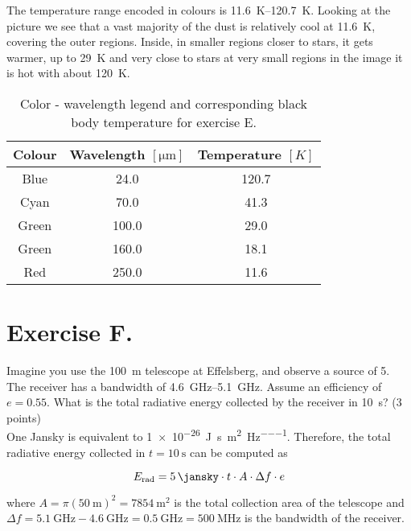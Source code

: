 \documentclass[11pt,a4paper,twoside]{article}
\begin{document}
The temperature range encoded in colours is \SIrange{11.6}{120.7}{\kelvin}.
Looking at the picture we see that a vast majority of the dust is relatively 
cool at \SI{11.6}{\kelvin}, covering the outer regions. Inside, in smaller
regions closer to stars, it gets warmer, up to \SI{29}{\kelvin} and very close
to stars at very small regions in the image it is hot with about
\SI{120}{\kelvin}.

\begin{table}[h!]
\centering
\begin{tabular}{ccc}\toprule
Colour  & Wavelength $[\si{\micro\meter}]$  & Temperature $[K]$  \\ \midrule
Blue    & 24.0  & 120.7                \\
Cyan    & 70.0  & 41.3                \\
Green   & 100.0 & 29.0                \\
Green   & 160.0 & 18.1                \\
Red     & 250.0 & 11.6               \\
\bottomrule
\end{tabular}
\caption{Color - wavelength legend and corresponding black body temperature for
         exercise E.}
\label{tab:col}
\end{table}


\section*{Exercise F.} 

Imagine you use the \SI{100}{\metre} telescope at Effelsberg, and observe a
source of \SI{5}{\jansky}. The receiver has a bandwidth of
\SIrange{4.6}{5.1}{\GHz}. Assume an efficiency of $e=\num{0.55}$. What is the total
radiative energy collected by the receiver in \SI{10}{\second}? (3 points) \\


One Jansky is equivalent to \SI{1e-26}{\joule\per\second\per\meter\squared\per\hertz}.
Therefore, the total radiative energy collected in $t = \SI{10}{\second}$ can
be computed as

\begin{equation}
 E_{\text{rad}} = \SI{5}{\jansky} \cdot t \cdot A \cdot \Delta f \cdot e
\end{equation}

where $A = \pi \left( \SI{50}{\metre} \right)^2 = \SI{7854}{\metre\squared}$ is
the total collection area of the telescope and $\Delta f = \SI{5.1}{\GHz} -
\SI{4.6}{\GHz} = \SI{0.5}{\GHz} = \SI{500}{\MHz}$ is the bandwidth of the
receiver. \\
\end{document}
